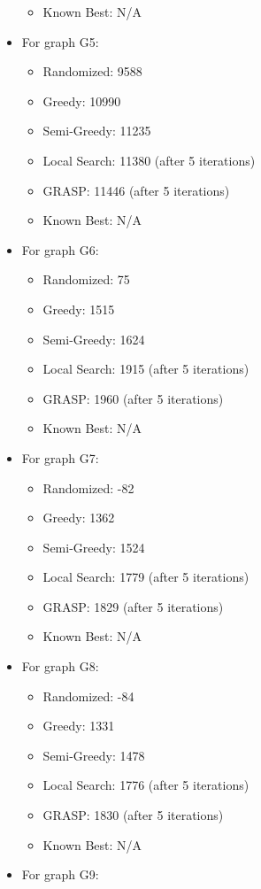\documentclass{article}%
\begin{document}
\begin{itemize}
\begin{itemize}
\item Known Best: N/A%
\end{itemize}%
\item For graph G5:%
\begin{itemize}%
\item Randomized: 9588%
\item Greedy: 10990%
\item Semi-Greedy: 11235%
\item Local Search: 11380 (after 5 iterations)%
\item GRASP: 11446 (after 5 iterations)%
\item Known Best: N/A%
\end{itemize}%
\item For graph G6:%
\begin{itemize}%
\item Randomized: 75%
\item Greedy: 1515%
\item Semi-Greedy: 1624%
\item Local Search: 1915 (after 5 iterations)%
\item GRASP: 1960 (after 5 iterations)%
\item Known Best: N/A%
\end{itemize}%
\item For graph G7:%
\begin{itemize}%
\item Randomized: -82%
\item Greedy: 1362%
\item Semi-Greedy: 1524%
\item Local Search: 1779 (after 5 iterations)%
\item GRASP: 1829 (after 5 iterations)%
\item Known Best: N/A%
\end{itemize}%
\item For graph G8:%
\begin{itemize}%
\item Randomized: -84%
\item Greedy: 1331%
\item Semi-Greedy: 1478%
\item Local Search: 1776 (after 5 iterations)%
\item GRASP: 1830 (after 5 iterations)%
\item Known Best: N/A%
\end{itemize}%
\item For graph G9:%
\begin{itemize}%

\end{itemize}
\end{itemize}
\end{document}
